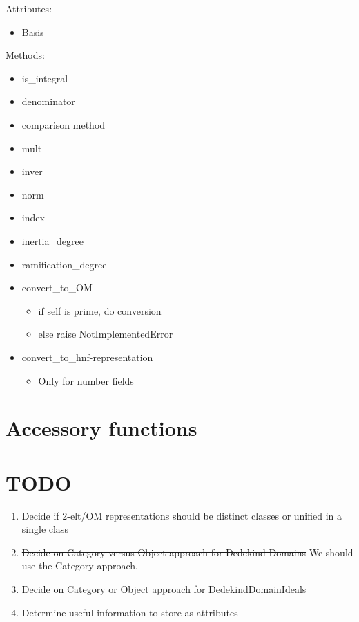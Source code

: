\documentclass{amsart}
\theoremstyle{definition}
\begin{document}
	Attributes:
	\begin{itemize}
		\item 
		Basis
	\end{itemize}
	
	Methods:
	\begin{itemize}
		\item
		is\_integral
		\item
		denominator
		\item
		comparison method
		\item
		mult
		\item
		inver
		\item
		norm
		\item
		index
		\item
		inertia\_degree
		\item
		ramification\_degree
		\item
		convert\_to\_OM
		\begin{itemize}
			\item 
			if self is prime, do conversion
			\item
			else raise NotImplementedError
		\end{itemize}
		\item
		convert\_to\_hnf-representation
		\begin{itemize}
			\item 
			Only for number fields
		\end{itemize}
	\end{itemize}

\section{Accessory functions}

\section{TODO}

\begin{enumerate}
	\item
		Decide if 2-elt/OM representations should be distinct classes or unified in a single class
	\item
		\st{ Decide on Category versus Object approach for Dedekind Domains} We should use the Category approach.
	\item
		Decide on Category or Object approach for DedekindDomainIdeals
	\item
		Determine useful information to store as attributes
\end{enumerate}
\end{document}

